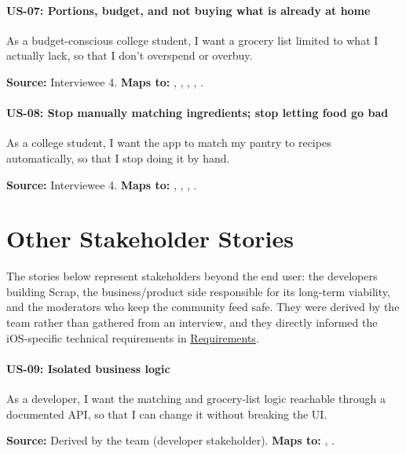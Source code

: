 \paragraph{US-07: Portions, budget, and not buying what is already at home}
As a budget-conscious college student, I want a grocery list limited to what I actually lack, so that I don't overspend or overbuy.

\noindent\textbf{Source:} Interviewee 4. \textbf{Maps to:} , , , , .

\paragraph{US-08: Stop manually matching ingredients; stop letting food go bad}
As a college student, I want the app to match my pantry to recipes automatically, so that I stop doing it by hand.

\noindent\textbf{Source:} Interviewee 4. \textbf{Maps to:} , , , .

\section{Other Stakeholder Stories}

\noindent The stories below represent stakeholders beyond the end user: the developers building Scrap, the business/product side responsible for its long-term viability, and the moderators who keep the community feed safe. They were derived by the team rather than gathered from an interview, and they directly informed the iOS-specific technical requirements in \hyperref[Chapter:Requirements]{Requirements}.

\paragraph{US-09: Isolated business logic}
As a developer, I want the matching and grocery-list logic reachable through a documented API, so that I can change it without breaking the UI.

\noindent\textbf{Source:} Derived by the team (developer stakeholder). \textbf{Maps to:} , .

